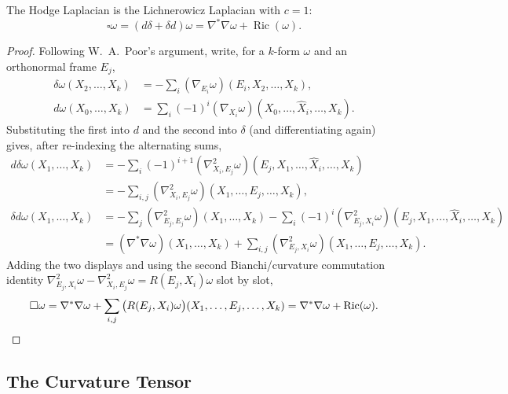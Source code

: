 \begin{theorem}
  \label{thm:pet-ch9-weitzenbock-hodge-laplacian}
  The Hodge Laplacian is the Lichnerowicz Laplacian with $c=1$:
  \[
    \square\omega=(d\delta+\delta d)\omega=\nabla^*\nabla\omega+\operatorname{Ric}(\omega).
  \]
\end{theorem}
\begin{proof}
  Following W.\ A.\ Poor's argument, write, for a $k$-form $\omega$ and an
  orthonormal frame $E_j$,
  \begin{align*}
    \delta\omega(X_2,\dots,X_k)&=-\sum_i(\nabla_{E_i}\omega)(E_i,X_2,\dots,X_k),\\
    d\omega(X_0,\dots,X_k)&=\sum_i(-1)^i(\nabla_{X_i}\omega)(X_0,\dots,\hat X_i,\dots,X_k).
  \end{align*}
  Substituting the first into $d$ and the second into $\delta$ (and
  differentiating again) gives, after re-indexing the alternating sums,
  \begin{align*}
    d\delta\omega(X_1,\dots,X_k)
    &=-\sum_i(-1)^{i+1}(\nabla^2_{X_i,E_j}\omega)(E_j,X_1,\dots,\hat X_i,\dots,X_k)\\
    &=-\sum_{i,j}(\nabla^2_{X_i,E_j}\omega)(X_1,\dots,E_j,\dots,X_k),\\[4pt]
    \delta d\omega(X_1,\dots,X_k)
    &=-\sum_j(\nabla^2_{E_j,E_j}\omega)(X_1,\dots,X_k)
      -\sum_i(-1)^i(\nabla^2_{E_j,X_i}\omega)(E_j,X_1,\dots,\hat X_i,\dots,X_k)\\
    &=(\nabla^*\nabla\omega)(X_1,\dots,X_k)
      +\sum_{i,j}(\nabla^2_{E_j,X_i}\omega)(X_1,\dots,E_j,\dots,X_k).
  \end{align*}
  Adding the two displays and using the second Bianchi/curvature commutation
  identity $\nabla^2_{E_j,X_i}\omega-\nabla^2_{X_i,E_j}\omega=R(E_j,X_i)\omega$
  slot by slot,
  \[
    \square\omega=\nabla^*\nabla\omega+\sum_{i,j}\big(R(E_j,X_i)\omega\big)(X_1,\dots,E_j,\dots,X_k)
    =\nabla^*\nabla\omega+\operatorname{Ric}(\omega).\qedhere
  \]
\end{proof}

\subsection{The Curvature Tensor}


